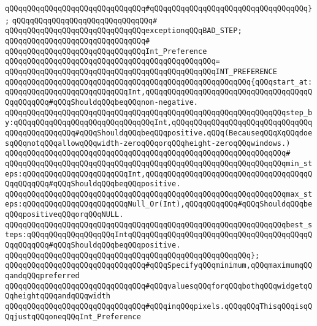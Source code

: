 \verb|qQQqqQQqqQQqqQQqqQQqqQQqqQQqqQQq#qQQqqQQqqQQqqQQqqQQqqQQqqQQqqQQqqQQq};|\newline
\verb|qQQqqQQqqQQqqQQqqQQqqQQqqQQqqQQq#|\newline
\verb|qQQqqQQqqQQqqQQqqQQqqQQqqQQqqQQqexceptionqQQqBAD_STEP;|\newline
\verb|qQQqqQQqqQQqqQQqqQQqqQQqqQQqqQQq#|\newline
\verb|qQQqqQQqqQQqqQQqqQQqqQQqqQQqqQQqInt_Preference|\newline
\verb|qQQqqQQqqQQqqQQqqQQqqQQqqQQqqQQqqQQqqQQqqQQqqQQq=|\newline
\verb|qQQqqQQqqQQqqQQqqQQqqQQqqQQqqQQqqQQqqQQqqQQqqQQqINT_PREFERENCE|\newline
\verb|qQQqqQQqqQQqqQQqqQQqqQQqqQQqqQQqqQQqqQQqqQQqqQQqqQQqqQQq{qQQqstart_at:qQQqqQQqqQQqqQQqqQQqqQQqqQQqInt,qQQqqQQqqQQqqQQqqQQqqQQqqQQqqQQqqQQqqQQqqQQqqQQq#qQQqShouldqQQqbeqQQqnon-negative.|\newline
\verb|qQQqqQQqqQQqqQQqqQQqqQQqqQQqqQQqqQQqqQQqqQQqqQQqqQQqqQQqqQQqqQQqstep_by:qQQqqQQqqQQqqQQqqQQqqQQqqQQqqQQqInt,qQQqqQQqqQQqqQQqqQQqqQQqqQQqqQQqqQQqqQQqqQQqqQQq#qQQqShouldqQQqbeqQQqpositive.qQQq(BecauseqQQqXqQQqdoesqQQqnotqQQqallowqQQqwidth-zeroqQQqorqQQqheight-zeroqQQqwindows.)|\newline
\verb|qQQqqQQqqQQqqQQqqQQqqQQqqQQqqQQqqQQqqQQqqQQqqQQqqQQqqQQqqQQqqQQq#|\newline
\verb|qQQqqQQqqQQqqQQqqQQqqQQqqQQqqQQqqQQqqQQqqQQqqQQqqQQqqQQqqQQqqQQqmin_steps:qQQqqQQqqQQqqQQqqQQqqQQqInt,qQQqqQQqqQQqqQQqqQQqqQQqqQQqqQQqqQQqqQQqqQQqqQQq#qQQqShouldqQQqbeqQQqpositive.|\newline
\verb|qQQqqQQqqQQqqQQqqQQqqQQqqQQqqQQqqQQqqQQqqQQqqQQqqQQqqQQqqQQqqQQqmax_steps:qQQqqQQqqQQqqQQqqQQqqQQqNull_Or(Int),qQQqqQQqqQQq#qQQqShouldqQQqbeqQQqpositiveqQQqorqQQqNULL.|\newline
\verb|qQQqqQQqqQQqqQQqqQQqqQQqqQQqqQQqqQQqqQQqqQQqqQQqqQQqqQQqqQQqqQQqbest_steps:qQQqqQQqqQQqqQQqqQQqIntqQQqqQQqqQQqqQQqqQQqqQQqqQQqqQQqqQQqqQQqqQQqqQQqqQQq#qQQqShouldqQQqbeqQQqpositive.|\newline
\verb|qQQqqQQqqQQqqQQqqQQqqQQqqQQqqQQqqQQqqQQqqQQqqQQqqQQqqQQq};|\newline
\newline
\verb|qQQqqQQqqQQqqQQqqQQqqQQqqQQqqQQq#qQQqSpecifyqQQqminimum,qQQqmaximumqQQqandqQQqpreferred|\newline
\verb|qQQqqQQqqQQqqQQqqQQqqQQqqQQqqQQq#qQQqvaluesqQQqforqQQqbothqQQqwidgetqQQqheightqQQqandqQQqwidth|\newline
\verb|qQQqqQQqqQQqqQQqqQQqqQQqqQQqqQQq#qQQqinqQQqpixels.qQQqqQQqThisqQQqisqQQqjustqQQqoneqQQqInt_Preference|\newline
